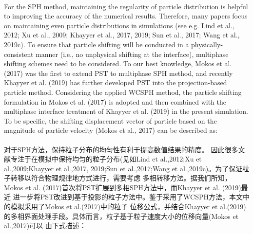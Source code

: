 \documentclass[UTF8]{ctexart}
\begin{document}
{{\paragraph{\quad}For the SPH method, maintaining the regularity 
                of particle distribution is helpful to improving 
                the accuracy of the numerical results. Therefore, 
                many papers focus on maintaining even particle 
                distributions in simulations 
                (see e.g. Lind et al., 2012; Xu et al., 2009; Khayyer et al., 2017, 2019; Sun et al., 2017; Wang et al., 2019c). 
                To ensure that particle shifting will be conducted in 
                a physically-consistent manner (i.e., no unphysical shifting at the interface), 
                multiphase shifting schemes need to be considered. 
                To our best knowledge, Mokos et al. (2017) was the first 
                to extend PST to multiphase SPH method, and recently Khayyer 
                et al. (2019) has further developed PST into the projection-based 
                particle method. Considering the applied WCSPH method, 
                the particle shifting formulation in Mokos et al. (2017) 
                is adopted and then combined with the multiphase interface 
                treatment of Khayyer et al. (2019) in the present simulation. 
                To be specific, the shifting displacement vector of particle 
                based on the magnitude of particle velocity (Mokos et al., 2017) 
                can be described as:
\paragraph{\quad}对于SPH方法，保持粒子分布的均匀性有利于提高数值结果的精度。
                因此很多文献专注于在模拟中保持均匀的粒子分布(见如Lind et al.,2012;Xu et al.,2009;Khayyer et al.,2017,
                2019;Sun et al.,2017;Wang et al.,2019c)。为了保证粒子转移以符合物理规律地方式进行，需要考虑
                多相转移方法。据我们所知，Mokos et al. (2017)首次将PST扩展到多相SPH方法中，而Khayyer et al. (2019)最近
                进一步将PST改进到基于投影的粒子方法中。鉴于采用了WCSPH方法，本文中的模拟采用了Mokos et al.(2017)中的粒子
                位移公式，并结合Khayyer et al.(2019)的多相界面处理手段。具体而言，粒子基于粒子速度大小的位移向量(Mokos et al.,2017)可以
                由下式描述：


}}
\end{document}
